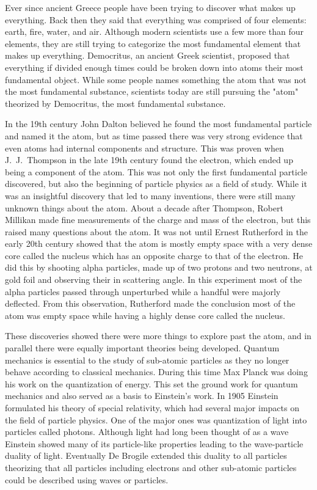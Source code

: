 Ever since ancient Greece people have been trying to discover what makes up everything. Back then they said that everything was comprised of four elements: earth, fire, water, and air. Although modern scientists use a few more than four elements, they are still trying to categorize the most fundamental element that makes up everything. Democritus, an ancient Greek scientist, proposed that everything if divided enough times could be broken down into atoms their most fundamental object. While some people names something the atom that was not the most fundamental substance, scientists today are still pursuing the "atom" theorized by Democritus, the most fundamental substance. 

In the 19th century John Dalton believed he found the most fundamental particle and named it the atom, but as time passed there was very strong evidence that even atoms had internal components and structure. This was proven when J.~J.~Thompson in the late 19th century found the electron, which ended up being a component of the atom. This was not only the first fundamental particle discovered, but also the beginning of particle physics as a field of study. While it was an insightful discovery that led to many inventions, there were still many unknown things about the atom. About a decade after Thompson, Robert Millikan made fine measurements of the charge and mass of the electron, but this raised many questions about the atom. It was not until Ernest Rutherford in the early 20th century showed that the atom is mostly empty space with a very dense core called the nucleus which has an opposite charge to that of the electron. He did this by shooting alpha particles, made up of two protons and two neutrons, at gold foil and observing their in scattering angle. In this experiment most of the alpha particles passed through unperturbed while a handful were majorly deflected. From this observation, Rutherford made the conclusion most of the atom was empty space while having a highly dense core called the nucleus. 

These discoveries showed there were more things to explore past the atom, and in parallel there were equally important theories being developed. Quantum mechanics is essential to the study of sub-atomic particles as they no longer behave according to classical mechanics. During this time Max Planck was doing his work on the quantization of energy. This set the ground work for quantum mechanics and also served as a basis to Einstein's work. In 1905 Einstein formulated his theory of special relativity, which had several major impacts on the field of particle physics. One of the major ones was quantization of light into particles called photons. Although light had long been thought of as a wave Einstein showed many of its particle-like properties leading to the wave-particle duality of light. Eventually De Brogile extended this duality to all particles theorizing that all particles including electrons and other sub-atomic particles could be described using waves or particles.

